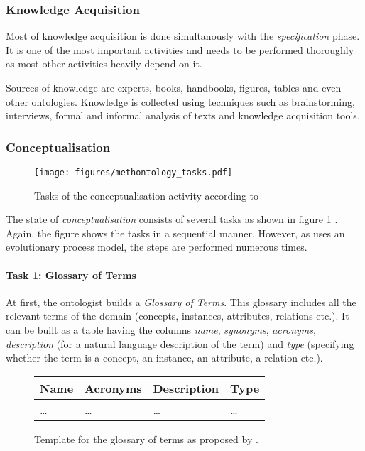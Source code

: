 \subsubsection{Knowledge Acquisition}

Most of knowledge acquisition is done simultanously with the \emph{specification} phase. It is one of the most important activities and needs to be performed thoroughly as most other activities heavily depend on it.

Sources of knowledge are experts, books, handbooks, figures, tables and even other ontologies. Knowledge is collected using techniques such as brainstorming, interviews, formal and informal analysis of texts and knowledge acquisition tools.

\subsubsection{Conceptualisation}
\label{subsec:methontology_conceptualisation}
\begin{figure}
  \texttt{[image: figures/methontology\_tasks.pdf]}
  \caption{Tasks of the conceptualisation activity according to \methontology \cite{MethontologyLegal}}
  \label{fig:methontology2}
\end{figure}

The state of \emph{conceptualisation} consists of several tasks as shown in figure \ref{fig:methontology2} \cite{MethontologyLegal}. Again, the figure shows the tasks in a sequential manner. However, as \methontology uses an evolutionary process model, the steps are performed numerous times.

\paragraph{Task 1: Glossary of Terms}

At first, the ontologist builds a \emph{Glossary of Terms}. This glossary includes all the relevant terms of the domain (concepts, instances, attributes, relations etc.). It can be built as a table having the columns \emph{name}, \emph{synonyms}, \emph{acronyms}, \emph{description} (for a natural language description of the term) and \emph{type} (specifying whether the term is a concept, an instance, an attribute, a relation etc.).

\begin{figure}
\centering
\begin{tabular}{|p{}|p{}|p{}|p{}|}
  \hline
  \textbf{Name} & \textbf{Acronyms} & \textbf{Description} & \textbf{Type} \\
  \hline\hline
  … & … & … & … \\
  \hline
\end{tabular}
\caption{Template for the glossary of terms as proposed by \methontology.}
\label{fig:methontology_example_glossary}
\end{figure}

